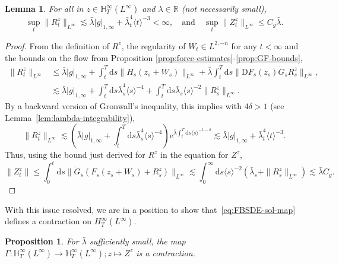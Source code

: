 \documentclass[11pt, a4paper]{scrartcl}
\numberwithin{equation}{section}
\theoremstyle{plain}
\newtheorem{lemma}[foo]{Lemma}
\newtheorem{proposition}[foo]{Proposition}
\theoremstyle{remark}
\newcommand{\mathD}{\mathrm{D}}
\newcommand{\mathd}{\mathrm{d}}
\newcommand{\mathe}{\mathrm{e}}
\begin{document}
\begin{lemma}
  \label{lem:B-to-B}For all in $z \in \mathbb{H}^{\infty}_T (L^{\infty})$ and
  $\lambda \in \mathbb{R}$ (not necessarily small),
  \[ \sup_t \| R^z_t \|_{L^{\infty}} \lesssim \bar{\lambda} | g |_{1, \infty} +
     \bar{\lambda}_t^4 \langle t \rangle^{- 3} < \infty, \quad \text{and} \quad
     \sup_t  \| Z^z_t \|_{L^{\infty}} \leqslant C_g \bar{\lambda} . \]
\end{lemma}

\begin{proof}
  From the definition of $R^z$, the regularity of $W_t \in L^{2, - n}$ for any
  $t < \infty$ and the bounds on the flow from Proposition
  \ref{prop:force-estimates}-\ref{prop:GF-bounds},
  \[ \begin{aligned}
       \| R_t^z \|_{L^{\infty}} &\leqslant  \bar{\lambda} | g |_{1, \infty} +
       \int_t^T \mathd s \| H_s (z_s + W_s) \|_{L^{\infty}} + \bar{\lambda} \int_t^T
       \mathd s \| \mathD F_s (z_s)  \dot{G}_s R^z_s \|_{L^{\infty}},\\
       & \lesssim  \bar{\lambda} | g |_{1, \infty} + \int_t^T \mathd s \bar{\lambda}_s^4
       \langle s \rangle^{- 4} + \int_t^T \mathd s \bar{\lambda}_s \langle s
       \rangle^{- 2} \| R^z_s \|_{L^{\infty}} .
     \end{aligned} \]
  By a backward version of Gronwall's inequality, this implies with $4 \delta >
  1$ (see Lemma~\ref{lem:lambda-integrability}),
  \begin{equation}
    \| R_t^z \|_{L^{\infty}} \lesssim \left( \bar{\lambda} | g |_{1, \infty} +
    \int_t^T \mathd s \bar{\lambda}_s^4 \langle s \rangle^{- 4} \right)
    \mathe^{\bar{\lambda} \int_t^T \mathd s \langle s \rangle^{- 1 - \delta}}
    \lesssim \bar{\lambda} | g |_{1, \infty} + \bar{\lambda}_t^4 \langle t \rangle^{- 3} .
    \label{eq:exp-R}
  \end{equation}
  Thus, using the bound just derived for $R^z$ in the equation for $Z^z$,
  \[ \| Z^z_t \| \leqslant \int_0^t \mathd s \| \dot{G}_s (F_s (z_s + W_s) +
     R^z_s) \|_{L^{\infty}} \lesssim \int_0^{\infty} \mathd s \langle s
     \rangle^{- 2} (\bar{\lambda}_s + \| R_s^z \|_{L^{\infty}}) \lesssim \bar{\lambda} C_g
     . \]
\end{proof}

With this issue resolved, we are in a position to show
that~\eqref{eq:FBSDE-sol-map} defines a contraction on $H^{\infty}_T
(L^{\infty})$.

\begin{proposition}
  \label{prop:contraction}For $\bar{\lambda}$ sufficiently small, the map $\Gamma :
  \mathbb{H}^{\infty}_T (L^{\infty}) \rightarrow \mathbb{H}^{\infty}_T
  (L^{\infty}) ; z \mapsto Z^z$ is a contraction.
\end{proposition}
\end{document}
